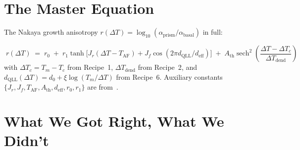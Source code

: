 \documentclass[final]{siamltex}
\begin{document}
\section{The Master Equation}

The Nakaya growth anisotropy
$r(\Delta T) = \log_{10}(\alpha_{\text{prism}}/\alpha_{\text{basal}})$
in full:
\begin{tcolorbox}[colback=blue!5,colframe=myblue]
\begin{equation}\label{eq:master}
\boxed{\;
r(\Delta T) \;=\; r_0 \;+\; r_1 \tanh\!\bigl[J_r(\Delta T - T_{\text{AF}})
   + J_f \cos(2\pi d_{\text{QLL}}/d_{\text{eff}})\bigr]
\;+\; A_{\text{th}} \operatorname{sech}^2\!\!\left(
        \frac{\Delta T - \Delta T_c}{\Delta T_{\text{dend}}}\right)
\;}
\end{equation}
with $\Delta T_c = T_m - T_c$ from Recipe~1, $\Delta
T_{\text{dend}}$ from Recipe~2, and $d_{\text{QLL}}(\Delta T) =
d_0 + \xi \log(T_m/\Delta T)$ from Recipe~6.  Auxiliary
constants $\{J_r, J_f, T_{\text{AF}}, A_{\text{th}}, d_{\text{eff}},
r_0, r_1\}$ are from~\cite{MamounPaperV}.
\end{tcolorbox}

\section{What We Got Right, What We Didn't}
\end{document}

